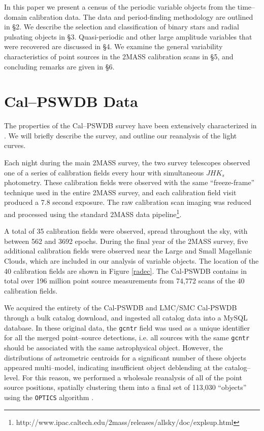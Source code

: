 \documentclass[]{emulateapj}
\begin{document}
In this paper we present a census of the periodic variable objects from the time--domain calibration data. The data and period-finding methodology are outlined in \S2. We describe the selection and classification of binary stars and radial pulsating objects in \S3. Quasi-periodic and other large amplitude variables that were recovered are discussed in \S4. We examine the general variability characteristics of point sources in the 2MASS calibration scans in \S5, and concluding remarks are given in \S6.



\section{Cal--PSWDB Data}

The properties of the Cal--PSWDB survey have been extensively characterized in \citet{plavchan2008a}. We will briefly describe the survey, and outline our reanalysis of the light curves.

Each night during the main 2MASS survey, the two survey telescopes observed one
of a series of calibration fields every hour with simultaneous $JHK_s$ photometry. These calibration fields were observed with the same ``freeze-frame'' technique used in the entire 2MASS survey, and each calibration field visit produced a 7.8 second exposure. The raw calibration scan imaging was reduced and processed using the standard 2MASS data pipeline\footnote{http://www.ipac.caltech.edu/2mass/releases/allsky/doc/explsup.html}.

A total of 35 calibration fields were observed, spread throughout the sky, with between 562 and 3692 epochs. During the final year of the 2MASS survey, five additional calibration fields were observed near the Large and Small Magellanic Clouds, which are included in our analysis of variable objects. The location of the 40 calibration fields are shown in Figure \ref{radec}. The Cal-PSWDB contains in total over 196 million point source measurements from 74,772 scans of the 40 calibration fields.


We acquired the entirety of the Cal-PSWDB and LMC/SMC Cal-PSWDB
through a bulk catalog download, and ingested all catalog data into a MySQL
database.  In these original data, the {\tt gcntr} field was used as a
unique identifier for all the merged point--source detections,
i.e. all sources with the same {\tt gcntr} should be associated with
the same astrophysical object.  However, the distributions of
astrometric centroids for a significant number of these objects
appeared multi--model, indicating insufficient object 
deblending at the catalog--level.  For this reason, we performed a wholesale
reanalysis of all of the point source positions, spatially clustering them
into a final set of 113,030 ``objects'' using the {\tt OPTICS}
algorithm \cite{optics}.
\end{document}

